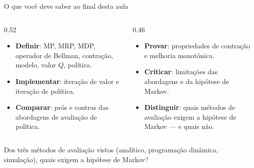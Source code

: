 \documentclass[aspectratio=169, 11pt]{beamer}
\begin{document}
\begin{frame}{O que você deve saber ao final desta aula}
  \begin{columns}[T]
    \begin{column}{0.52\textwidth}
      {\small
      \begin{itemize}\setlength{\itemsep}{0.5ex}
        \item \textbf{Definir}: MP, MRP, MDP, operador de Bellman, contração, modelo,
              valor $Q$, política.
        \item \textbf{Implementar}: iteração de valor e iteração de política.
        \item \textbf{Comparar}: prós e contras das abordagens de avaliação de política.
      \end{itemize}}
    \end{column}
    \begin{column}{0.46\textwidth}
      {\small
      \begin{itemize}\setlength{\itemsep}{0.5ex}
        \item \textbf{Provar}: propriedades de contração e melhoria monotônica.
        \item \textbf{Criticar}: limitações das abordagens e da hipótese de Markov.
        \item \textbf{Distinguir}: quais métodos de avaliação exigem a hipótese de
              Markov --- e quais não.
      \end{itemize}}
    \end{column}
  \end{columns}
  \vspace{0.4em}
  \begin{alertabox}
    Dos três métodos de avaliação vistos (analítico, programação dinâmica, simulação), quais exigem a hipótese de Markov?
  \end{alertabox}
\end{frame}

\begin{frame}
\end{frame}
\end{document}

